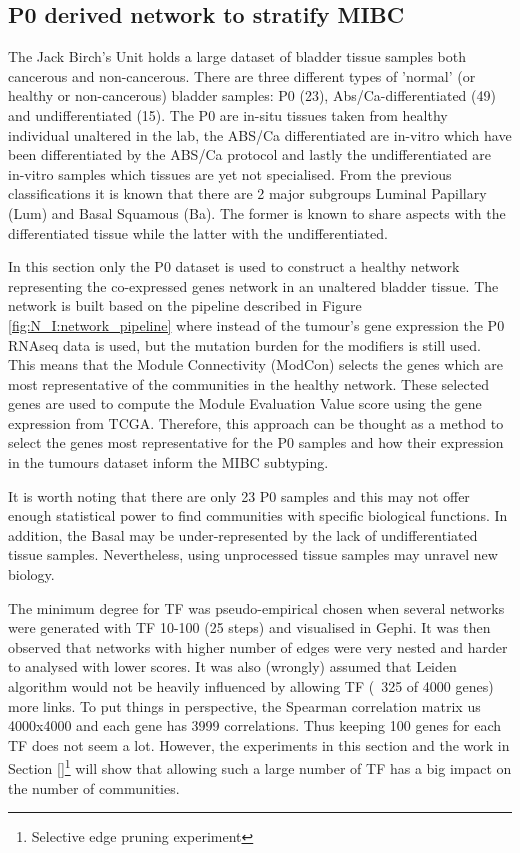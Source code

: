

\subsection{P0 derived network to stratify MIBC} \label{s:p0}

 
The Jack Birch's Unit holds a large dataset of bladder tissue samples both cancerous and non-cancerous. There are three different types of 'normal'  (or healthy or non-cancerous) bladder samples: P0 (23), Abs/Ca-differentiated (49) and undifferentiated (15). The P0 are in-situ tissues taken from healthy individual unaltered in the lab, the ABS/Ca differentiated are in-vitro which have been differentiated by the ABS/Ca protocol and lastly the undifferentiated are in-vitro samples which tissues are yet not specialised. From the previous classifications \citet{Robertson2017-mg, Kamoun2020-tj} it is known that there are 2 major subgroups Luminal Papillary (Lum) and Basal Squamous (Ba). The former is known to share aspects with the differentiated tissue while the latter with the undifferentiated. 

In this section only the P0 dataset is used to construct a healthy network representing the co-expressed genes network in an unaltered bladder tissue. The network is built based on the pipeline described in Figure \ref{fig:N_I:network_pipeline} where instead of the tumour's gene expression the P0 RNAseq data is used, but the mutation burden for the modifiers is still used. This means that the Module Connectivity (ModCon) selects the genes which are most representative of the communities in the healthy network. These selected genes are used to compute the Module Evaluation Value score using the gene expression from TCGA. Therefore, this approach can be thought as a method to select the genes most representative for the P0 samples and how their expression in the tumours dataset inform the MIBC subtyping. 

It is worth noting that there are only 23 P0 samples and this may not offer enough statistical power to find communities with specific biological functions. In addition, the Basal may be under-represented by the lack of undifferentiated tissue samples. Nevertheless, using unprocessed tissue samples may unravel new biology.

The minimum degree for TF was pseudo-empirical chosen when several networks were generated with TF 10-100 (25 steps) and visualised in Gephi. It was then observed that networks with higher number of edges were very nested and harder to analysed with lower scores. It was also (wrongly) assumed that Leiden algorithm would not be heavily influenced by allowing TF (~325 of 4000 genes) more links. To put things in perspective, the Spearman correlation matrix us 4000x4000 and each gene has 3999 correlations. Thus keeping 100 genes for each TF does not seem a lot. However, the experiments in this section and the work in Section \ref{}\footnote{Selective edge pruning experiment} will show that allowing such a large number of TF has a big impact on the number of communities.

